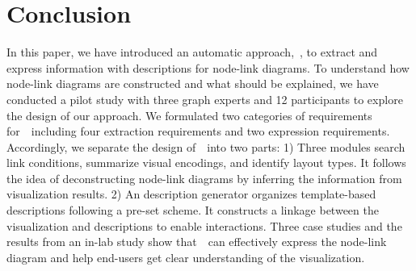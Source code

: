\section{Conclusion}
In this paper, we have introduced an automatic approach,~\ApproachName, to extract and express information with descriptions for node-link diagrams.
To understand how node-link diagrams are constructed and what should be explained, we have conducted a pilot study with three graph experts and 12 participants to explore the design of our approach.
We formulated two categories of requirements for~\ApproachName~including four extraction requirements and two expression requirements.
Accordingly, we separate the design of~\ApproachName~into two parts: 1) Three modules search link conditions, summarize visual encodings, and identify layout types. It follows the idea of deconstructing node-link diagrams by inferring the information from visualization results.
2) An description generator organizes template-based descriptions following a pre-set scheme. It constructs a linkage between the visualization and descriptions to enable interactions.
Three case studies and the results from an in-lab study show that~\ApproachName~can effectively express the node-link diagram and help end-users get clear understanding of the visualization.
